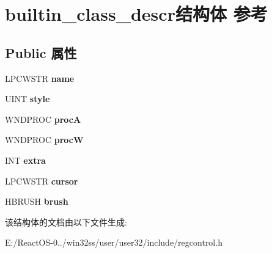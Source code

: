 \hypertarget{structbuiltin__class__descr}{}\section{builtin\+\_\+class\+\_\+descr结构体 参考}
\label{structbuiltin__class__descr}
\subsection*{Public 属性}
\begin{DoxyCompactItemize}
\item 
\mbox{\label{structbuiltin__class__descr_a38f4aa2ab9be86b5b9368ed1508d419e}} 
L\+P\+C\+W\+S\+TR {\bfseries name}
\item 
\mbox{\label{structbuiltin__class__descr_ab566f8f29de3ddb5540be8542b6d754e}} 
U\+I\+NT {\bfseries style}
\item 
\mbox{\label{structbuiltin__class__descr_a6391946b39f4e91212a3d17c0123d46d}} 
W\+N\+D\+P\+R\+OC {\bfseries procA}
\item 
\mbox{\label{structbuiltin__class__descr_aa8afd6a907201c0a851c897ee0a2104e}} 
W\+N\+D\+P\+R\+OC {\bfseries procW}
\item 
\mbox{\label{structbuiltin__class__descr_a736eab35a7fa3d9a3ffb6c00dc277804}} 
I\+NT {\bfseries extra}
\item 
\mbox{\label{structbuiltin__class__descr_a88a55b2f6768be56525952e66e5a81ca}} 
L\+P\+C\+W\+S\+TR {\bfseries cursor}
\item 
\mbox{\label{structbuiltin__class__descr_a3cff55ddf806df472ecef0265c8b6e73}} 
H\+B\+R\+U\+SH {\bfseries brush}
\end{DoxyCompactItemize}


该结构体的文档由以下文件生成\+:\begin{DoxyCompactItemize}
\item 
E\+:/\+React\+O\+S-\/0../win32ss/user/user32/include/regcontrol.\+h\end{DoxyCompactItemize}
